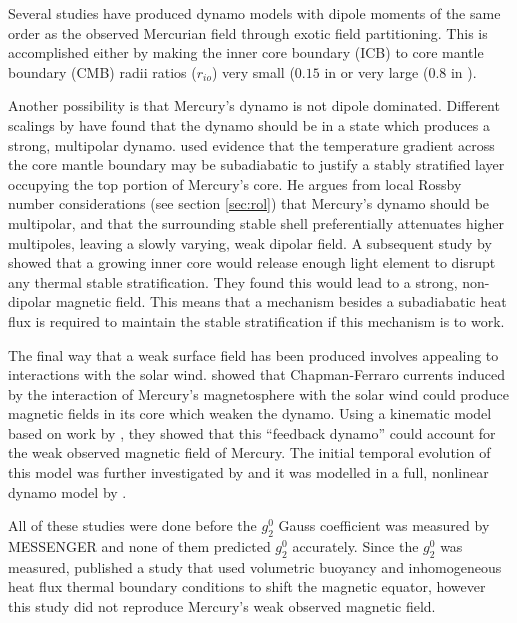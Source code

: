 Several studies \citep{stanleyandbloxham2005,heimpelandaurnou2005,christensen06,takahashi06} have produced dynamo models with dipole moments of the same order as the observed Mercurian field through exotic field partitioning. This is accomplished either by making the inner core boundary (ICB) to core mantle boundary (CMB) radii ratios ($r_{io}$) very small ($0.15$ in \citet{heimpelandaurnou2005} or very large ($0.8$ in \citet{stanleyandbloxham2005}).

Another possibility is that Mercury's dynamo is not dipole dominated. Different scalings by \citet{OlsonandChristensen2006} have found that the dynamo should be in a state which produces a strong, multipolar dynamo. \citet{christensen06} used evidence that the temperature gradient across the core mantle boundary may be subadiabatic to justify a stably stratified layer occupying the top portion of Mercury's core. He argues from local Rossby number considerations (see section \ref{sec:rol}) that Mercury's dynamo should be multipolar, and that the surrounding stable shell preferentially attenuates higher multipoles, leaving a slowly varying, weak dipolar field. A subsequent study by \citet{manglik2010} showed that a growing inner core would release enough light element to disrupt any thermal stable stratification. They found this would lead to a strong, non-dipolar magnetic field. This means that a mechanism besides a subadiabatic heat flux is required to maintain the stable stratification if this mechanism is to work.

The final way that a weak surface field has been produced involves appealing to interactions with the solar wind. \citet{glassmaier2007} showed that Chapman-Ferraro currents induced by the interaction of Mercury's magnetosphere with the solar wind could produce magnetic fields in its core which  weaken the dynamo. Using a kinematic model based on work by \citet{levy1979}, they showed that this ``feedback dynamo'' could account for the weak observed magnetic field of Mercury. The initial temporal evolution of this model was further investigated by \citet{heyner2010} and it was modelled in a full, nonlinear dynamo model by \citet{heyner2011}.

All of these studies were done before the $g_2^0$ Gauss coefficient was measured by MESSENGER and none of them predicted $g_2^0$ accurately. Since the $g_2^0$ was measured, \citet{cao2014} published a study that used volumetric buoyancy and inhomogeneous heat flux thermal boundary conditions to shift the magnetic equator, however this study did not reproduce Mercury's weak observed magnetic field.

